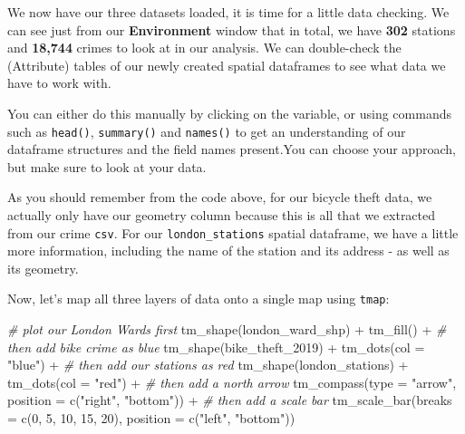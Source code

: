 \documentclass[
]{book}
\newenvironment{Shaded}{\begin{snugshade}}{\end{snugshade}}
\newcommand{\AttributeTok}[1]{\textcolor[rgb]{0.77,0.63,0.00}{#1}}
\newcommand{\CommentTok}[1]{\textcolor[rgb]{0.56,0.35,0.01}{\textit{#1}}}
\newcommand{\DecValTok}[1]{\textcolor[rgb]{0.00,0.00,0.81}{#1}}
\newcommand{\FunctionTok}[1]{\textcolor[rgb]{0.00,0.00,0.00}{#1}}
\newcommand{\NormalTok}[1]{#1}
\newcommand{\SpecialCharTok}[1]{\textcolor[rgb]{0.00,0.00,0.00}{#1}}
\newcommand{\StringTok}[1]{\textcolor[rgb]{0.31,0.60,0.02}{#1}}
\begin{document}
We now have our three datasets loaded, it is time for a little data checking. We can see just from our \textbf{Environment} window that in total, we have \textbf{302} stations and \textbf{18,744} crimes to look at in our analysis. We can double-check the (Attribute) tables of our newly created spatial dataframes to see what data we have to work with.

You can either do this manually by clicking on the variable, or using commands such as \texttt{head()}, \texttt{summary()} and \texttt{names()} to get an understanding of our dataframe structures and the field names present.You can choose your approach, but make sure to look at your data.

As you should remember from the code above, for our bicycle theft data, we actually only have our geometry column because this is all that we extracted from our crime \texttt{csv}. For our \texttt{london\_stations} spatial dataframe, we have a little more information, including the name of the station and its address - as well as its geometry.

Now, let's map all three layers of data onto a single map using \texttt{tmap}:

\begin{Shaded}
\begin{Highlighting}[]
\CommentTok{\# plot our London Wards first}
\FunctionTok{tm\_shape}\NormalTok{(london\_ward\_shp) }\SpecialCharTok{+} \FunctionTok{tm\_fill}\NormalTok{() }\SpecialCharTok{+}
  \CommentTok{\# then add bike crime as blue}
  \FunctionTok{tm\_shape}\NormalTok{(bike\_theft\_2019) }\SpecialCharTok{+} \FunctionTok{tm\_dots}\NormalTok{(}\AttributeTok{col =} \StringTok{"blue"}\NormalTok{) }\SpecialCharTok{+}
  \CommentTok{\# then add our stations as red}
  \FunctionTok{tm\_shape}\NormalTok{(london\_stations) }\SpecialCharTok{+} \FunctionTok{tm\_dots}\NormalTok{(}\AttributeTok{col =} \StringTok{"red"}\NormalTok{) }\SpecialCharTok{+}
  \CommentTok{\# then add a north arrow}
  \FunctionTok{tm\_compass}\NormalTok{(}\AttributeTok{type =} \StringTok{"arrow"}\NormalTok{, }\AttributeTok{position =} \FunctionTok{c}\NormalTok{(}\StringTok{"right"}\NormalTok{, }\StringTok{"bottom"}\NormalTok{)) }\SpecialCharTok{+}
  \CommentTok{\# then add a scale bar}
  \FunctionTok{tm\_scale\_bar}\NormalTok{(}\AttributeTok{breaks =} \FunctionTok{c}\NormalTok{(}\DecValTok{0}\NormalTok{, }\DecValTok{5}\NormalTok{, }\DecValTok{10}\NormalTok{, }\DecValTok{15}\NormalTok{, }\DecValTok{20}\NormalTok{), }\AttributeTok{position =} \FunctionTok{c}\NormalTok{(}\StringTok{"left"}\NormalTok{, }\StringTok{"bottom"}\NormalTok{))}
\end{Highlighting}
\end{Shaded}
\end{document}
